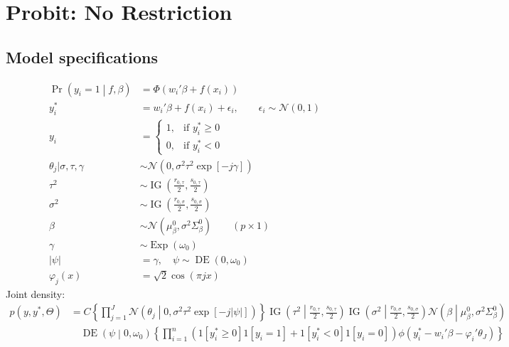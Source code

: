\documentclass[11pt]{article}
\newcommand{\opn}{\operatorname}
\begin{document}
\section{Probit: No Restriction}
\subsection{Model specifications}
\begin{align*}
  \opn{Pr}\left(y_{i}=1\middle| f, \beta\right) &= \Phi\left(w_{i}'\beta + f\left(x_{i}\right)\right)\\
  y_{i}^{*} &= w_{i}'\beta + f\left(x_{i}\right) + \epsilon_{i}, \qquad \epsilon_{i} \sim \mathcal{N}\left(0,1\right)\\
  y_{i} &= \begin{cases}1, & \text{if $y_{i}^{*} \geq 0$}\\ 0, & \text{if $y_{i}^{*} <0$}  \end{cases}\\
  \theta_{j}|\sigma, \tau, \gamma &\sim \mathcal{N}\left(0, \sigma^{2}\tau^{2}\exp\left[-j\gamma\right]\right)\\
  \tau^{2} &\sim \opn{IG}\left(\frac{r_{0,\tau}}{2}, \frac{s_{0,\tau}}{2}\right)\\
  \sigma^{2} &\sim \opn{IG}\left(\frac{r_{0,\sigma}}{2}, \frac{s_{0,\sigma}}{2}\right)\\
  \beta &\sim \mathcal{N}\left(\mu_{\beta}^{0}, \sigma^{2}\Sigma_{\beta}^{0}\right)\qquad \left(p\times 1 \right)\\
  \gamma &\sim \opn{Exp}\left(\omega_{0}\right)\\
  \left|\psi\right| &= \gamma, \quad \psi \sim \opn{DE}\left(0, \omega_{0}\right)\\
  \varphi_{j}\left(x\right) &= \sqrt{2}\cos\left(\pi j x\right)
\end{align*}
Joint density:
\begin{align*}
  p\left(y, y^{*}, \Theta\right) &= C\left\{\prod_{j=1}^{J}\mathcal{N}\left(\theta_{j}\middle| 0, \sigma^{2}\tau^{2}\exp\left[-j\left|\psi\right|\right]\right) \right\}\opn{IG}\left(\tau^{2}\middle|\frac{r_{0,\tau}}{2},\frac{s_{0,\tau}}{2}\right)\opn{IG}\left(\sigma^{2}\middle|\frac{r_{0,\sigma}}{2},\frac{s_{0,\sigma}}{2}\right)\mathcal{N}\left(\beta\middle|\mu_{\beta}^{0},\sigma^{2}\Sigma_{\beta}^{0}\right)\\
  &\quad \opn{DE}\left(\psi\middle|0,\omega_{0}\right)\left\{\prod_{i=1}^{n}\left(1\left[y_{i}^{*}\geq 0\right]1\left[y_{i}=1\right] + 1\left[y_{i}^{*}<0\right]1\left[y_{i}=0\right] \right)\phi\left(y_{i}^{*}-w_{i}'\beta - \varphi_{i}'\theta_{J}\right)\right\}
\end{align*}
\end{document}
